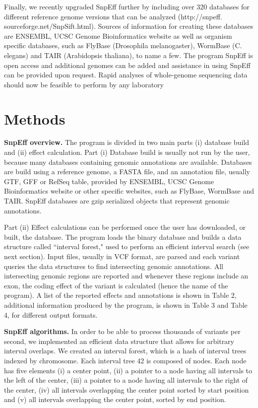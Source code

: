 Finally, we recently upgraded SnpEff further by including over 320 databases for different reference genome versions that can be analyzed (http://snpeff.  sourceforge.net/SnpSift.html). Sources of information for creating these databases are ENSEMBL, UCSC Genome Bioinformatics website as well as organism specific databases, such as FlyBase (Drosophila melanogaster), WormBase (C.  elegans) and TAIR (Arabidopsis thaliana), to name a few. The program SnpEff is open access and additional genomes can be added and assistance in using SnpEff can be provided upon request. Rapid analyses of whole-genome sequencing data should now be feasible to perform by any laboratory

\section{Methods}

\textbf{SnpEff overview.} The program is divided in two main parts (i) database build and (ii) effect calculation. Part (i) Database build is usually not run by the user, because many databases containing genomic annotations are available. Databases are build using a reference genome, a FASTA file, and an annotation file, usually GTF, GFF or RefSeq table, provided by ENSEMBL, UCSC Genome Bioinformatics website or other specific websites, such as FlyBase, WormBase and TAIR. SnpEff databases are gzip serialized objects that represent genomic annotations.

Part (ii) Effect calculations can be performed once the user has downloaded, or built, the database. The program loads the binary database and builds a data structure called ``interval forest," used to perform an efficient interval search (see next section). Input files, usually in VCF format, are parsed and each variant queries the data structures to find intersecting genomic annotations. All intersecting genomic regions are reported and whenever these regions include an exon, the coding effect of the variant is calculated (hence the name of the program). A list of the reported effects and annotations is shown in Table 2, additional information produced by the program, is shown in Table 3 and Table 4, for different output formats.

\textbf{SnpEff algorithms.} In order to be able to process thousands of variants per second, we implemented an efficient data structure that allows for arbitrary interval overlaps. We created an interval forest, which is a hash of interval trees indexed by chromosome.  Each interval tree 42 is composed of nodes. Each node has five elements (i) a center point, (ii) a pointer to a node having all intervals to the left of the center, (iii) a pointer to a node having all intervals to the right of the center, (iv) all intervals overlapping the center point sorted by start position and (v) all intervals overlapping the center point, sorted by end position.

